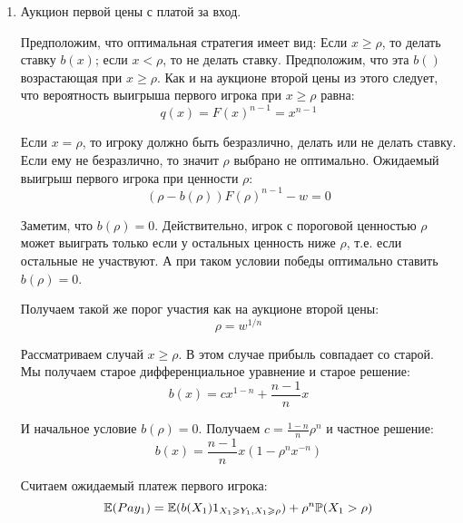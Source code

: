 \begin{enumerate}
\item Аукцион первой цены с платой за вход. 

Предположим, что оптимальная стратегия имеет вид: Если $ x\geq \rho $, то делать ставку $ b(x) $; если $ x<\rho $, то не делать ставку. Предположим, что эта $ b() $ возрастающая при $ x\geq \rho $. Как и на аукционе второй цены из этого следует, что вероятность выигрыша первого игрока при $ x\geq\rho $ равна:
\begin{equation}
q(x)=F(x)^{n-1}=x^{n-1} 
\end{equation}


Если $ x=\rho $, то игроку должно быть безразлично, делать или не делать ставку. Если ему не безразлично, то значит $ \rho $ выбрано не оптимально. Ожидаемый выигрыш первого игрока при ценности $ \rho $:
\begin{equation}
(\rho-b(\rho))F(\rho)^{n-1}-w=0
\end{equation}

Заметим, что $ b(\rho)=0 $. Действительно, игрок с пороговой ценностью $ \rho $ может выиграть только если у остальных ценность ниже $ \rho $, т.е. если остальные не участвуют. А при таком условии победы оптимально ставить $ b(\rho)=0 $.

Получаем такой же порог участия как на аукционе второй цены:
\begin{equation}
\rho=w^{1/n} 
\end{equation}

Рассматриваем случай $ x\geq \rho $. В этом случае прибыль совпадает со старой. Мы получаем старое дифференциальное уравнение и старое решение:
\begin{equation}
b(x)=cx^{1-n}+\frac{n-1}{n}x
\end{equation}

И начальное условие $ b(\rho)=0 $. Получаем $ c=\frac{1-n}{n}\rho^{n} $ и частное решение:
\begin{equation}
b(x)=\frac{n-1}{n}x(1-\rho^{n}x^{-n})
\end{equation}

Считаем ожидаемый платеж первого игрока:
\begin{equation}
\mathbb{E}(Pay_{1})=\mathbb{E}(b(X_{1})1_{X_{1}\geqslant Y_{1},X_{1}\geqslant \rho})+\rho^{n}\mathbb{P}(X_{1}>\rho)
\end{equation}


\end{enumerate}
